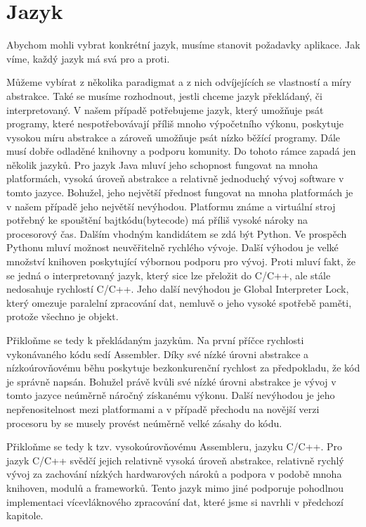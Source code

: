 	\section{Jazyk}
	Abychom mohli vybrat konkrétní jazyk, musíme stanovit požadavky aplikace. Jak víme, každý jazyk má svá pro a proti.\par
	Můžeme vybírat z několika paradigmat a z nich odvíjejících se vlastností a míry abstrakce. Také se musíme rozhodnout, jestli chceme jazyk překládaný, či interpretovaný. V našem případě potřebujeme jazyk, který umožňuje psát programy, které nespotřebovávají příliš mnoho výpočetního výkonu, poskytuje vysokou míru abstrakce a zároveň umožňuje psát nízko běžící programy. Dále musí dobře odladěné knihovny a podporu komunity. Do tohoto rámce zapadá jen několik jazyků. Pro jazyk Java mluví jeho schopnost fungovat na mnoha platformách, vysoká úroveň abstrakce a relativně jednoduchý vývoj software v tomto jazyce. Bohužel, jeho největší přednost fungovat na mnoha platformách je v našem případě jeho největší nevýhodou. Platformu známe a virtuální stroj potřebný ke spouštění bajtkódu(bytecode) má příliš vysoké nároky na procesorový čas. Dalším vhodným kandidátem se zdá být Python. Ve prospěch Pythonu mluví možnost neuvěřitelně rychlého vývoje. Další výhodou je velké množství knihoven poskytující výbornou podporu pro vývoj. Proti mluví fakt, že se jedná o interpretovaný jazyk, který sice lze přeložit do C/C++, ale stále nedosahuje rychlostí C/C++. Jeho další nevýhodou je Global Interpreter Lock, který omezuje paralelní zpracování dat, nemluvě o jeho vysoké spotřebě paměti, protože všechno je objekt.\par
	Přikloňme se tedy k překládaným jazykům. Na první příčce rychlosti vykonávaného kódu sedí Assembler. Díky své nízké úrovni abstrakce a nízkoúrovňovému běhu poskytuje bezkonkurenční rychlost za předpokladu, že kód je správně napsán. Bohužel právě kvůli své nízké úrovni abstrakce je vývoj v tomto jazyce neúměrně náročný získanému výkonu. Další nevýhodou je jeho nepřenositelnost mezi platformami a v případě přechodu na novější verzi procesoru by se musely provést neúměrně velké zásahy do kódu.\par
	Přikloňme se tedy k tzv. vysokoúrovňovému Assembleru, jazyku C/C++. Pro jazyk C/C++ svědčí jejich relativně vysoká úroveň abstrakce, relativně rychlý vývoj za zachování nízkých hardwarových nároků a podpora v podobě mnoha knihoven, modulů a frameworků. Tento jazyk mimo jiné podporuje pohodlnou implementaci vícevláknového zpracování dat, které jsme si navrhli v předchozí kapitole.
	
